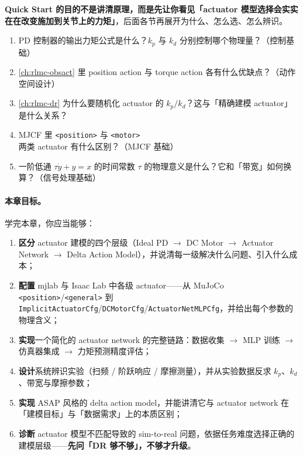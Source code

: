 \noindent\textbf{Quick Start 的目的不是讲清原理，而是先让你看见「actuator 模型选择会实实在在改变施加到关节上的力矩」}，后面各节再展开为什么、怎么选、怎么辨识。

\begin{practice}
\begin{enumerate}
  \item PD 控制器的输出力矩公式是什么？$k_p$ 与 $k_d$ 分别控制哪个物理量？（控制基础）
  \item \cref{ch:rlmc-obsact} 里 position action 与 torque action 各有什么优缺点？（动作空间设计）
  \item \cref{ch:rlmc-dr} 为什么要随机化 actuator 的 $k_p/k_d$？这与「精确建模 actuator」是什么关系？
  \item MJCF 里 \verb|<position>| 与 \verb|<motor>| 两类 actuator 有什么区别？（MJCF 基础）
  \item 一阶低通 $\tau\dot y + y = x$ 的时间常数 $\tau$ 的物理意义是什么？它和「带宽」如何换算？（信号处理基础）
\end{enumerate}
\end{practice}

\paragraph{本章目标。}学完本章，你应当能够：
\begin{enumerate}
  \item \textbf{区分} actuator 建模的四个层级（Ideal PD $\to$ DC Motor $\to$ Actuator Network $\to$ Delta Action Model），并说清每一级解决什么问题、引入什么成本；
  \item \textbf{配置} mjlab 与 Isaac Lab 中各级 actuator——从 MuJoCo \verb|<position>|/\verb|<general>| 到 \verb|ImplicitActuatorCfg|/\verb|DCMotorCfg|/\verb|ActuatorNetMLPCfg|，并给出每个参数的物理含义；
  \item \textbf{实现}一个简化的 actuator network 的完整链路：数据收集 $\to$ MLP 训练 $\to$ 仿真器集成 $\to$ 力矩预测精度评估；
  \item \textbf{设计}系统辨识实验（扫频 / 阶跃响应 / 摩擦测量），并从实验数据反求 $k_p$、$k_d$、带宽与摩擦参数；
  \item \textbf{实现} ASAP 风格的 delta action model，并能讲清它与 actuator network 在「建模目标」与「数据需求」上的本质区别；
  \item \textbf{诊断} actuator 模型不匹配导致的 sim-to-real 问题，依据任务难度选择正确的建模层级——\textbf{先问「DR 够不够」，不够才升级}。
\end{enumerate}

